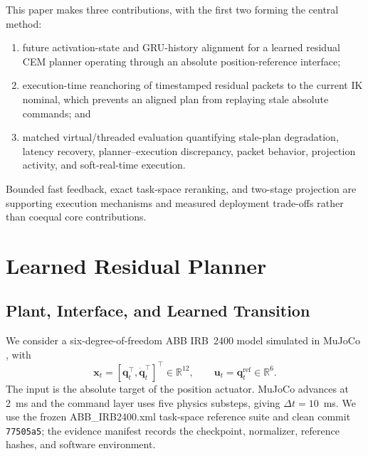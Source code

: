 \documentclass[conference]{IEEEtran}
\begin{document}
This paper makes three contributions, with the first two forming the central method:
\begin{enumerate}
  \item future activation-state and GRU-history alignment for a learned residual CEM planner operating through an absolute position-reference interface;
  \item execution-time reanchoring of timestamped residual packets to the current IK nominal, which prevents an aligned plan from replaying stale absolute commands; and
  \item matched virtual/threaded evaluation quantifying stale-plan degradation, latency recovery, planner--execution discrepancy, packet behavior, projection activity, and soft-real-time execution.
\end{enumerate}
Bounded fast feedback, exact task-space reranking, and two-stage projection are supporting execution mechanisms and measured deployment trade-offs rather than coequal core contributions.

\section{Learned Residual Planner}
\label{sec:planner}

\subsection{Plant, Interface, and Learned Transition}
We consider a six-degree-of-freedom ABB IRB~2400 model simulated in MuJoCo \cite{todorov2012mujoco}, with
\begin{equation}
  \bm{x}_t=[\bm{q}_t^\top,\dot{\bm{q}}_t^\top]^\top\in\mathbb{R}^{12},
  \qquad \bm{u}_t=\bm{q}^{\mathrm{ref}}_t\in\mathbb{R}^{6}.
\end{equation}
The input is the absolute target of the position actuator. MuJoCo advances at 2~ms and the command layer uses five physics substeps, giving $\Delta t=10$~ms. We use the frozen ABB\_IRB2400.xml task-space reference suite and clean commit \texttt{77505a5}; the evidence manifest records the checkpoint, normalizer, reference hashes, and software environment.
\end{document}
